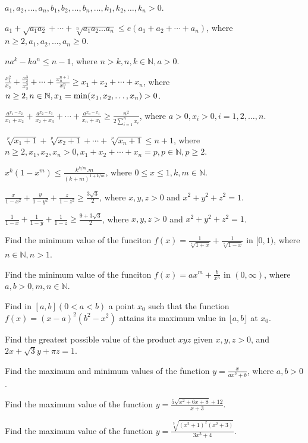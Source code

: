   $a_1, a_2,\ldots, a_n, b_1, b_2, \ldots, b_n, \ldots, k_1, k_2, \ldots, k_n > 0$.
\item $a_1 + \sqrt{a_1a_2} + \cdots + \sqrt[n]{a_1a_2\ldots a_n}\leq e(a_1 + a_2 + \cdots + a_n)$, where $n\geq 2, a_1, a_2,
  \ldots, a_n\geq 0$.
\item $na^k - ka^n\leq n - 1$, where $n > k, n, k\in\mathbb{N}, a > 0$.
\item $\frac{x_1^2}{x_2} + \frac{x_2^3}{x_3^2} + \cdots + \frac{x_n^{n + 1}}{x_1^n}\geq x_1 + x_2 + \cdots + x_n$, where $n\geq 2,
  n\in\mathbb{N}, x_1 = {\rm min}(x_1, x_2, \ldots, x_n) > 0$.
\item $\frac{a^{x_1 - x_2}}{x_1 + x_2} + \frac{a^{x_2 - x_3}}{x_2 + x_3} + \cdots + \frac{a^{x_n - x_1}}{x_n +
  x_1}\geq \frac{n^2}{2\displaystyle\sum_{i=1}^nx_i}$, where $a > 0, x_i > 0, i = 1, 2, \ldots, n$.
\item $\sqrt[p]{x_1 + 1} + \sqrt[p]{x_2 + 1} + \cdots + \sqrt[p]{x_n + 1}\leq n + 1$, where $n\geq 2, x_1, x_2, x_n > 0, x_1 + x_2
  + \cdots + x_n = p, p\in\mathbb{N}, p\geq 2$.
\item $x^k(1 - x^m)\leq \frac{k^{k/m}.m}{(k + m)^{1 + k/m}}$, where $0\leq x\leq 1, k, m\in\mathbb{N}$.
\item $\frac{x}{1 - x^2} + \frac{y}{1 - y^2} + \frac{z}{1 - z^2}\geq \frac{3\sqrt{3}}{2}$, where $x, y, z > 0$ and $x^2 + y^2 + z^2
  = 1$.
\item $\frac{1}{1 - x} + \frac{1}{1 - y} + \frac{1}{1 - z}\geq \frac{9 + 3\sqrt{3}}{2}$, where $x, y, z > 0$ and $x^2 + y^2 + z^2
  = 1$.
\item Find the minimum value of the funciton $f(x) = \frac{1}{\sqrt[n]{1 + x}} + \frac{1}{\sqrt[n]{1 - x}}$ in $[0, 1)$, where
  $n\in\mathbb{N}, n > 1$.
\item Find the minimum value of the funciton $f(x) = ax^m + \frac{b}{x^n}$ in $(0, \infty)$, where $a, b > 0, m, n\in\mathbb{N}$.
\item Find in $[a, b] (0 < a < b)$ a point $x_0$ such that the function $f(x) = (x - a)^2(b^2 - x^2)$ attains its maximum value in
  $\lfloor a, b\rfloor$ at $x_0$.
\item Find the greatest possible value of the product $xyz$ given $x, y, z > 0$, and $2x + \sqrt{3}y + \pi z = 1$.
\item Find the maximum and minimum values of the function $y = \frac{x}{ax^2 + b}$, where $a, b > 0$.
\item Find the maximum value of the function $y = \frac{5\sqrt{x^2 + 6x + 8} + 12}{x + 3}$.
\item Find the maximum value of the function $y = \frac{\sqrt[3]{(x^2 + 1)^2(x^2 + 3)}}{3x^3 + 4}$.
